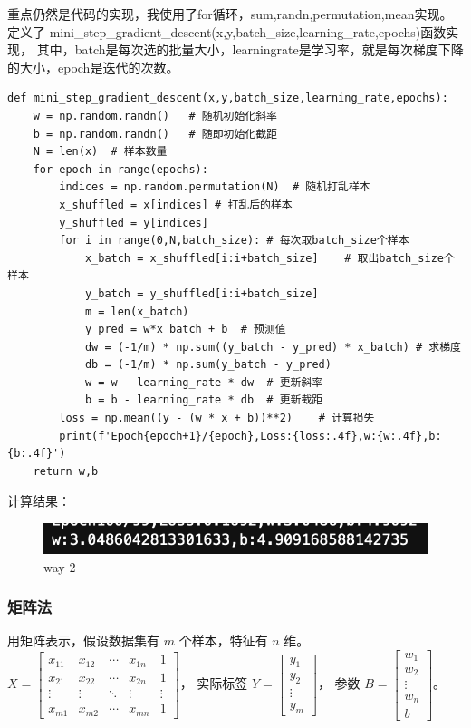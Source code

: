 \documentclass[12pt,a4paper,oneside]{article}
\begin{document}
重点仍然是代码的实现，我使用了for循环，sum,randn,permutation,mean实现。定义了
mini\_step\_gradient\_descent(x,y,batch\_size,learning\_rate,epochs)函数实现，
其中，batch是每次选的批量大小，learningrate是学习率，就是每次梯度下降的大小，epoch是迭代的次数。
\begin{lstlisting}
def mini_step_gradient_descent(x,y,batch_size,learning_rate,epochs):
    w = np.random.randn()   # 随机初始化斜率
    b = np.random.randn()   # 随即初始化截距
    N = len(x)  # 样本数量
    for epoch in range(epochs):
        indices = np.random.permutation(N)  # 随机打乱样本
        x_shuffled = x[indices] # 打乱后的样本
        y_shuffled = y[indices]
        for i in range(0,N,batch_size): # 每次取batch_size个样本
            x_batch = x_shuffled[i:i+batch_size]    # 取出batch_size个样本
            y_batch = y_shuffled[i:i+batch_size]
            m = len(x_batch)    
            y_pred = w*x_batch + b  # 预测值
            dw = (-1/m) * np.sum((y_batch - y_pred) * x_batch) # 求梯度
            db = (-1/m) * np.sum(y_batch - y_pred)  
            w = w - learning_rate * dw  # 更新斜率
            b = b - learning_rate * db  # 更新截距
        loss = np.mean((y - (w * x + b))**2)    # 计算损失
        print(f'Epoch{epoch+1}/{epoch},Loss:{loss:.4f},w:{w:.4f},b:{b:.4f}')
    return w,b
\end{lstlisting}
计算结果：
\begin{figure}[H]
    \centering
    \begin{minipage}[b]{0.5\textwidth}
        \centering
        \includegraphics[width=\textwidth]{2}
        \caption{way 2}
        \label{fig:code}
    \end{minipage}
\end{figure}
\subsubsection{矩阵法}
用矩阵表示，假设数据集有 $m$ 个样本，特征有 $n$ 维。$X=\left[ 
\begin{array}{cccc|c} 
    x_{11} & x_{12} & \cdots & x_{1n} & 1 \\
    x_{21} & x_{22} & \cdots & x_{2n} & 1 \\
    \vdots & \vdots & \ddots & \vdots & \vdots \\
    x_{m1} & x_{m2} & \cdots & x_{mn} & 1 
\end{array} \right]$，
实际标签 $Y=\left[ 
\begin{array}{c} 
    y_{1} \\
    y_{2} \\
    \vdots \\
    y_{m}
\end{array} \right]$，
参数 $B=\left[ 
\begin{array}{c} 
    w_{1} \\
    w_{2} \\
    \vdots \\
    w_{n} \\
    b
\end{array} \right]$。
\end{document}
